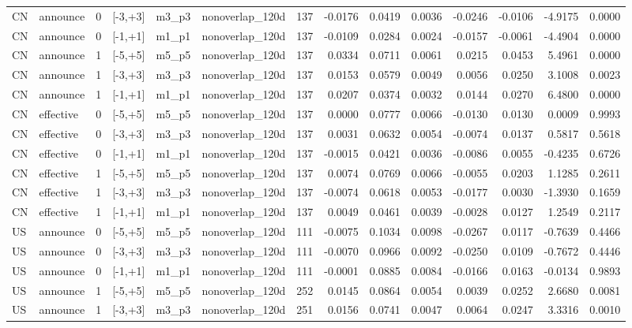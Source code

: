 \begin{tabular}{llrlllrrrrrrrr}
CN & announce & 0 & [-3,+3] & m3_p3 & nonoverlap_120d & 137 & -0.0176 & 0.0419 & 0.0036 & -0.0246 & -0.0106 & -4.9175 & 0.0000 \\
CN & announce & 0 & [-1,+1] & m1_p1 & nonoverlap_120d & 137 & -0.0109 & 0.0284 & 0.0024 & -0.0157 & -0.0061 & -4.4904 & 0.0000 \\
CN & announce & 1 & [-5,+5] & m5_p5 & nonoverlap_120d & 137 & 0.0334 & 0.0711 & 0.0061 & 0.0215 & 0.0453 & 5.4961 & 0.0000 \\
CN & announce & 1 & [-3,+3] & m3_p3 & nonoverlap_120d & 137 & 0.0153 & 0.0579 & 0.0049 & 0.0056 & 0.0250 & 3.1008 & 0.0023 \\
CN & announce & 1 & [-1,+1] & m1_p1 & nonoverlap_120d & 137 & 0.0207 & 0.0374 & 0.0032 & 0.0144 & 0.0270 & 6.4800 & 0.0000 \\
CN & effective & 0 & [-5,+5] & m5_p5 & nonoverlap_120d & 137 & 0.0000 & 0.0777 & 0.0066 & -0.0130 & 0.0130 & 0.0009 & 0.9993 \\
CN & effective & 0 & [-3,+3] & m3_p3 & nonoverlap_120d & 137 & 0.0031 & 0.0632 & 0.0054 & -0.0074 & 0.0137 & 0.5817 & 0.5618 \\
CN & effective & 0 & [-1,+1] & m1_p1 & nonoverlap_120d & 137 & -0.0015 & 0.0421 & 0.0036 & -0.0086 & 0.0055 & -0.4235 & 0.6726 \\
CN & effective & 1 & [-5,+5] & m5_p5 & nonoverlap_120d & 137 & 0.0074 & 0.0769 & 0.0066 & -0.0055 & 0.0203 & 1.1285 & 0.2611 \\
CN & effective & 1 & [-3,+3] & m3_p3 & nonoverlap_120d & 137 & -0.0074 & 0.0618 & 0.0053 & -0.0177 & 0.0030 & -1.3930 & 0.1659 \\
CN & effective & 1 & [-1,+1] & m1_p1 & nonoverlap_120d & 137 & 0.0049 & 0.0461 & 0.0039 & -0.0028 & 0.0127 & 1.2549 & 0.2117 \\
US & announce & 0 & [-5,+5] & m5_p5 & nonoverlap_120d & 111 & -0.0075 & 0.1034 & 0.0098 & -0.0267 & 0.0117 & -0.7639 & 0.4466 \\
US & announce & 0 & [-3,+3] & m3_p3 & nonoverlap_120d & 111 & -0.0070 & 0.0966 & 0.0092 & -0.0250 & 0.0109 & -0.7672 & 0.4446 \\
US & announce & 0 & [-1,+1] & m1_p1 & nonoverlap_120d & 111 & -0.0001 & 0.0885 & 0.0084 & -0.0166 & 0.0163 & -0.0134 & 0.9893 \\
US & announce & 1 & [-5,+5] & m5_p5 & nonoverlap_120d & 252 & 0.0145 & 0.0864 & 0.0054 & 0.0039 & 0.0252 & 2.6680 & 0.0081 \\
US & announce & 1 & [-3,+3] & m3_p3 & nonoverlap_120d & 251 & 0.0156 & 0.0741 & 0.0047 & 0.0064 & 0.0247 & 3.3316 & 0.0010 \\

\end{tabular}
